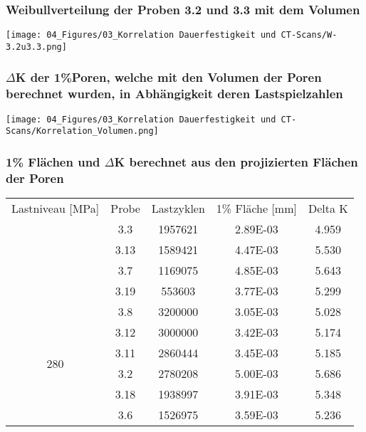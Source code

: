   \subsubsection{Weibullverteilung der Proben 3.2 und 3.3 mit dem Volumen}
    \label{Weibullverteilung der Proben 3.2 und 3.3}
    \begin{center}
      \texttt{[image: 04\_Figures/03\_Korrelation Dauerfestigkeit und CT-Scans/W-3.2u3.3.png]}
    \end{center}

  \subsubsection{\(\Delta\)K der 1\%Poren, welche mit den Volumen der Poren berechnet wurden, in Abhängigkeit deren Lastspielzahlen}
    \label{K vs N Volume1}
    \begin{center}
      \texttt{[image: 04\_Figures/03\_Korrelation Dauerfestigkeit und CT-Scans/Korrelation\_Volumen.png]}
    \end{center}

  \subsubsection{1\% Flächen und $\Delta$K berechnet aus den projizierten Flächen der Poren}
  \label{1pP mit Projizierter Fläche}
    \begin{center}
    \begin{tabular}{ccccc}
    \thickhline
    Lastniveau {[}MPa{]}  & Probe & Lastzyklen & 1\% Fläche {[}mm{]} & Delta K \\ \thickhline
    \multirow{4}{*}{300}  & 3.3   & 1957621    & 2.89E-03            & 4.959   \\
                          & 3.13  & 1589421    & 4.47E-03            & 5.530   \\
                          & 3.7   & 1169075    & 4.85E-03            & 5.643   \\
                          & 3.19  & 553603     & 3.77E-03            & 5.299   \\ \hline
    \multirow{6}{*}{280}  & 3.8   & 3200000    & 3.05E-03            & 5.028   \\
                          & 3.12  & 3000000    & 3.42E-03            & 5.174   \\
                          & 3.11  & 2860444    & 3.45E-03            & 5.185   \\
                          & 3.2   & 2780208    & 5.00E-03            & 5.686   \\
                          & 3.18  & 1938997    & 3.91E-03            & 5.348   \\
                          & 3.6   & 1526975    & 3.59E-03            & 5.236   \\\hline
    \end{tabular}
    \end{center}

